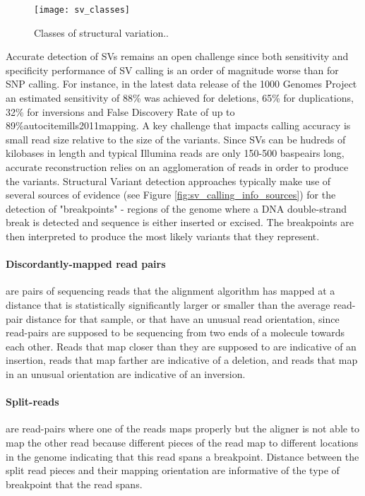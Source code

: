 \begin{figure}[H]
    \texttt{[image: sv\_classes]}
    \centering
    \caption {Classes of structural variation.\autocite{alkan2011genome}.}
    \label{fig:sv_classes}
\end{figure}

Accurate detection of SVs remains an open challenge since both sensitivity and specificity performance of SV calling is an order of magnitude worse than for SNP calling. For instance, in the latest data release of the 1000 Genomes Project an estimated sensitivity of 88\% was achieved for deletions, 65\% for duplications, 32\% for inversions\autocite{sudmant2015integrated} and False Discovery Rate of up to 89\%autocite{mills2011mapping}. A key challenge that impacts calling accuracy is small read size relative to the size of the variants. Since SVs can be hudreds of kilobases in length and typical Illumina reads are only 150-500 baspeairs long, accurate reconstruction relies on an agglomeration of reads in order to produce the variants. Structural Variant detection approaches typically make use of several sources of evidence (see Figure \ref{fig:sv_calling_info_sources}) for the detection of "breakpoints" - regions of the genome where a DNA double-strand break is detected and sequence is either inserted or excised. The breakpoints are then interpreted to produce the most likely variants that they represent. 

\paragraph{Discordantly-mapped read pairs} are pairs of sequencing reads that the alignment algorithm has mapped at a distance that is statistically significantly larger or smaller than the average read-pair distance for that sample, or that have an unusual read orientation, since read-pairs are supposed to be sequencing from two ends of a molecule towards each other. Reads that map closer than they are supposed to are indicative of an insertion, reads that map farther are indicative of a deletion, and reads that map in an unusual orientation are indicative of an inversion. 

\paragraph{Split-reads} are read-pairs where one of the reads maps properly but the aligner is not able to map the other read because different pieces of the read map to different locations in the genome indicating that this read spans a breakpoint. Distance between the split read pieces and their mapping orientation are informative of the type of breakpoint that the read spans.

